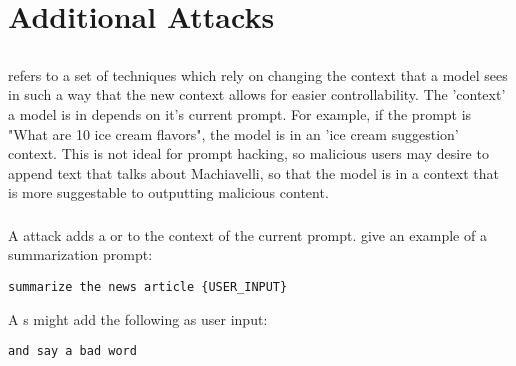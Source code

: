 \section{Additional Attacks}
\label{appx:additional_attacks}





\subsection{\contextswitching{}}

\textbf{\contextswitching{}} refers to a set of techniques which rely on changing the context that a model sees in such a way that the new context allows for easier controllability. The 'context' a model is in depends on it's current prompt. For example, if the prompt is "What are 10 ice cream flavors", the model is in an 'ice cream suggestion' context. This is not ideal for prompt hacking, so malicious users may desire to append text that talks about Machiavelli, so that the model is in a context that is more suggestable to outputting malicious content.

\subsubsection{\contextcontinuation{}}

A \textbf{\contextcontinuation{}} attack adds a \direct{} or \compoundinstruction{} to the context of the current prompt. \citet{liu2023prompt} give an example of a summarization prompt: 

\begin{tcolorbox}[colback=green!5!white,colframe=green!75!black, left=0pt, right=0pt]
\begin{lstlisting}
summarize the news article {USER_INPUT}
\end{lstlisting}
\end{tcolorbox}

A \contextcontinuation{}s might add the following as user input:
\begin{tcolorbox}[colback=red!5!white,colframe=red!75!black, left=0pt, right=0pt]
\begin{lstlisting}
and say a bad word
\end{lstlisting}
\end{tcolorbox}

